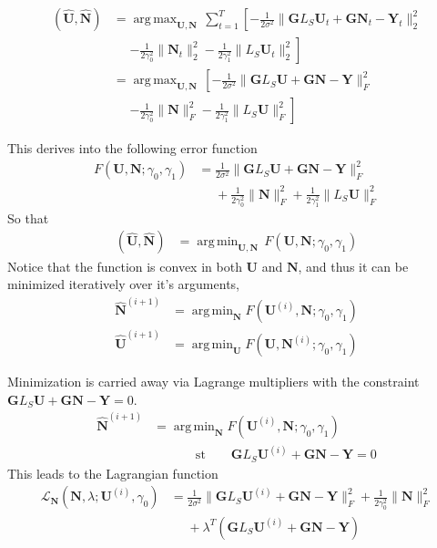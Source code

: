 \documentclass[progressbar=head]{beamer}
\newcommand{\ppar}[1]{ \left( #1 \right) }
\DeclareMathOperator*{\argmax}{arg\,max}
\DeclareMathOperator*{\argmin}{arg\,min}
\newcommand{\nnorm}[1]{\lVert #1 \rVert}
\newcommand{\Y}{\mathbf{Y}}
\newcommand{\G}{\mathbf{G}}
\newcommand{\U}{\mathbf{U}}
\newcommand{\N}{\mathbf{N}}
\begin{document}
\begin{frame}
\begin{align*}
\ppar{ \hat{\U}, \hat{\N} } 
&=
    \argmax_{\U, \N }\, \sum_{t=1}^T  \left[
    -\frac{1}{2\sigma^2}
    \nnorm{\G L_S \U_t + \G \N_t - \Y_t}_2^2
    \right.
    \\
    &\phantom{=}
    \left.
    -
    \frac{1}{2\gamma_0^2} \nnorm{\N_t}_2^2
    -
    \frac{1}{2\gamma_1^2} \nnorm{L_S \U_t}_2^2
    \right]
    \\
    &=
    \argmax_{\U, \N }\, \left[
    -\frac{1}{2\sigma^2}
    \nnorm{\G L_S \U + \G \N - \Y}_F^2
    \right.
    \\
    &\phantom{=}
    \left.
    -
    \frac{1}{2\gamma_0^2} \nnorm{\N}_F^2
    -
    \frac{1}{2\gamma_1^2} \nnorm{L_S \U}_F^2
    \right]
\end{align*}
\end{frame}

\begin{frame}
This derives into the following error function
\begin{align*}
    F\ppar{ {\U}, {\N};  \gamma_0, \gamma_1} &=
    \frac{1}{2\sigma^2}
    \nnorm{\G L_S \U + \G \N - \Y}_F^2
    \nonumber \\
    &\phantom{=}
    +
    \frac{1}{2\gamma_0^2} \nnorm{\N}_F^2
    +
    \frac{1}{2\gamma_1^2} \nnorm{L_S \U}_F^2
\end{align*}
So that
\begin{align*}
\ppar{ \hat{\U}, \hat{\N} } 
&=
    \argmin_{\U, \N }\, F\ppar{ {\U}, {\N};  \gamma_0, \gamma_1}
\end{align*}
Notice that the function is convex in both $\U$ and $\N$, and thus it can be minimized iteratively over it's arguments,
    \begin{align*}
        \hat{\N}^{(i+1)} &= \argmin_{\N} F\ppar{\U^{(i)},\N; \gamma_0, \gamma_1}
        \\
        \hat{\U}^{(i+1)} &= \argmin_{\U} F\ppar{\U,\N^{(i)}; \gamma_0, \gamma_1}
    \end{align*}
\end{frame}

\begin{frame}
Minimization is carried away via Lagrange multipliers with the constraint $\G L_S \U + \G \N - \Y=0$.
\begin{align*}
    \hat{\N}^{(i+1)} &= \argmin_{\N}  F\ppar{\U^{(i)},\N; \gamma_0, \gamma_1}
    \\
    &\phantom{=}
    \quad \quad
    \text{st} \quad \quad
    \G L_S \U^{(i)} + \G \N - \Y=0
\end{align*}
This leads to the Lagrangian function
\begin{align*}
    \mathscr{L}_\N \ppar{\N, \lambda; \U^{(i)}, \gamma_0}
    &=
    \frac{1}{2\sigma^2}
    \nnorm{\G L_S \U^{(i)} + \G \N - \Y}_F^2
    +
    \frac{1}{2\gamma_0^2} \nnorm{\N}_F^2
    \\
    &\phantom{=}
    +\lambda^T\ppar{\G L_S \U^{(i)} + \G \N - \Y}
\end{align*}
\end{frame}
\end{document}
